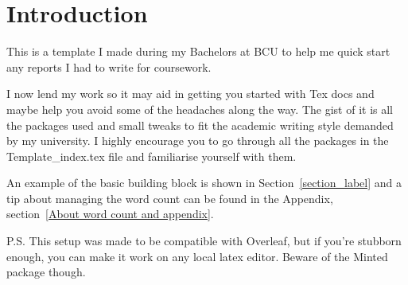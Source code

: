 \section{Introduction}\label{introduction}
This is a template I made during my Bachelors at BCU to help me quick start any reports I had to write for coursework. 
\par
I now lend my work so it may aid in getting you started with Tex docs and maybe help you avoid some of the headaches along the way. The gist of it is all the packages used and small tweaks to fit the academic writing style demanded by my university. I highly encourage you to go through all the packages in the Template\_index.tex file and familiarise yourself with them.
\par
An example of the basic building block is shown in Section~\ref{section_label} and a tip about managing the word count can be found in the Appendix, section~\ref{About word count and appendix}.
\par
P.S. This setup was made to be compatible with Overleaf, but if you're stubborn enough, you can make it work on any local latex editor. Beware of the Minted package though.